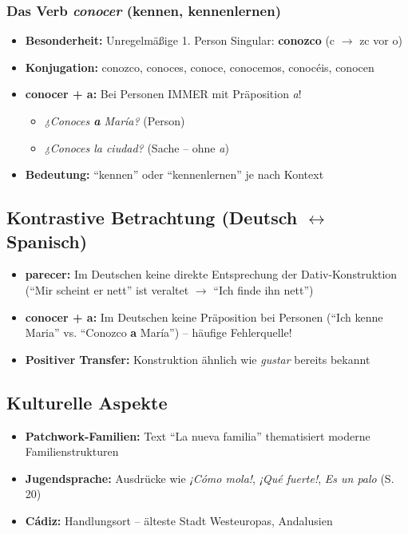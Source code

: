 \documentclass[11pt,a4paper]{article}
\begin{document}
\subsubsection{Das Verb \textit{conocer} (kennen, kennenlernen)}
\begin{itemize}
    \item \textbf{Besonderheit:} Unregelmäßige 1. Person Singular: \textbf{conozco} (c $\rightarrow$ zc vor o)
    \item \textbf{Konjugation:} conozco, conoces, conoce, conocemos, conocéis, conocen
    \item \textbf{conocer + a:} Bei Personen IMMER mit Präposition \textit{a}!
    \begin{itemize}
        \item \textit{¿Conoces \textbf{a} María?} (Person)
        \item \textit{¿Conoces la ciudad?} (Sache -- ohne \textit{a})
    \end{itemize}
    \item \textbf{Bedeutung:} ``kennen'' oder ``kennenlernen'' je nach Kontext
\end{itemize}

\subsection{Kontrastive Betrachtung (Deutsch $\leftrightarrow$ Spanisch)}
\begin{itemize}
    \item \textbf{parecer:} Im Deutschen keine direkte Entsprechung der Dativ-Konstruktion (``Mir scheint er nett'' ist veraltet $\rightarrow$ ``Ich finde ihn nett'')
    \item \textbf{conocer + a:} Im Deutschen keine Präposition bei Personen (``Ich kenne Maria'' vs. ``Conozco \textbf{a} María'') -- häufige Fehlerquelle!
    \item \textbf{Positiver Transfer:} Konstruktion ähnlich wie \textit{gustar} bereits bekannt
\end{itemize}

\subsection{Kulturelle Aspekte}
\begin{itemize}
    \item \textbf{Patchwork-Familien:} Text ``La nueva familia'' thematisiert moderne Familienstrukturen
    \item \textbf{Jugendsprache:} Ausdrücke wie \textit{¡Cómo mola!}, \textit{¡Qué fuerte!}, \textit{Es un palo} (S. 20)
    \item \textbf{Cádiz:} Handlungsort -- älteste Stadt Westeuropas, Andalusien
\end{itemize}
\end{document}
